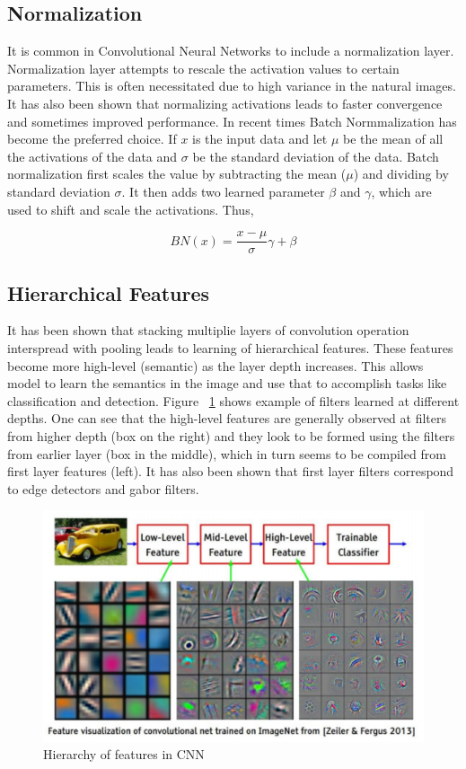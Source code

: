 \subsection{Normalization}

It is common in Convolutional Neural Networks to include a normalization layer. Normalization layer attempts to rescale the activation values to certain parameters. This is often necessitated due to high variance in the natural images. It has also been shown that normalizing activations leads to faster convergence and sometimes improved performance. In recent times Batch Normmalization has become the preferred choice. If $x$ is the input data and let $\mu$ be the mean of all the activations of the data and $\sigma$ be the standard deviation of the data. Batch normalization first scales the value by subtracting the mean ($\mu$) and dividing by standard deviation $\sigma$. It then adds two learned parameter $\beta$ and $\gamma$, which are used to shift and scale the activations. Thus,

$$
BN(x) = \frac{x-\mu}{\sigma} \gamma + \beta
$$

\subsection{Hierarchical Features}
It has been shown that stacking multiplie layers of convolution operation interspread with pooling leads to learning of hierarchical features. These features become more high-level (semantic) as the layer depth increases. This allows model to learn the semantics in the image and use that to accomplish tasks like classification and detection. Figure ~\ref{fig:features} shows example of filters learned at different depths. One can see that the high-level features are generally observed at filters from higher depth (box on the right) and they look to be formed using the filters from earlier layer (box in the middle), which in turn seems to be compiled from first layer features (left). It has also been shown that first layer filters correspond to edge detectors and gabor filters.

\begin{figure}[H]
	\centering
   \includegraphics[scale=0.36]{figures/intro/features.png}
   \caption[Hierarchy of features]{Hierarchy of features in CNN}
   \label{fig:features}
\end{figure}

